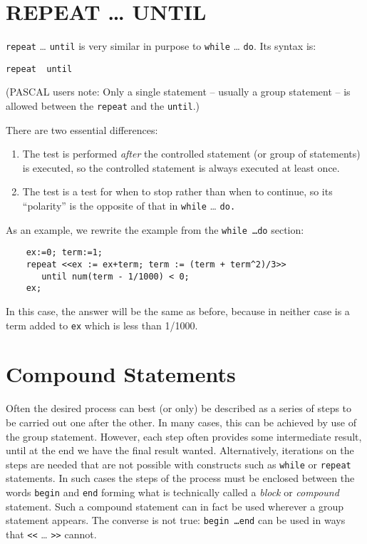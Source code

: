 \section{REPEAT \ldots{} UNTIL}
\hypertarget{command:REPEAT}{}
\hypertarget{reserved:UNTIL}{}

\texttt{repeat} \ldots{} \texttt{until} is very similar
in purpose to \texttt{while} \ldots{} \texttt{do}.  Its syntax is:
\begin{syntax}
  \texttt{repeat }\texttt{ until }
\end{syntax}
(PASCAL users note: Only a single statement -- usually a group statement
-- is allowed between the \texttt{repeat} and the \texttt{until}.)

There are two essential differences:
\begin{enumerate}
\item The test is performed \emph{after} the controlled statement (or group of
statements) is executed, so the controlled statement is always executed at
least once.

\item The test is a test for when to stop rather than when to continue, so its
``polarity'' is the opposite of that in \texttt{while} \ldots{} \texttt{do.}
\end{enumerate}

As an example, we rewrite the example from the \texttt{while \ldots do} section:
\begin{samepage}
\begin{verbatim}
    ex:=0; term:=1;
    repeat <<ex := ex+term; term := (term + term^2)/3>>
       until num(term - 1/1000) < 0;
    ex;
\end{verbatim}
\end{samepage}
In this case, the answer will be the same as before, because in neither
case is a term added to \texttt{ex} which is less than 1/1000.

\section{Compound Statements}
\hypertarget{command:BEGIN}{}

Often the desired process
can best (or only) be
described as a series of steps to be carried out one after the other.  In
many cases, this can be achieved by use of the group statement.  However, each step often provides some intermediate
result, until at the end we have the final result wanted.  Alternatively,
iterations on the steps are needed that are not possible with constructs
such as \texttt{while} or \texttt{repeat}
statements.  In such cases the steps of the process must be
enclosed between the words \texttt{begin} and \texttt{end} forming what is technically called a \emph{block} or
\emph{compound} statement.  Such a compound statement can in fact be used
wherever a group statement appears.  The converse is not true: \texttt{begin
\ldots end} can be used in ways
that \texttt{<}\texttt{<} \ldots{} \texttt{>}\texttt{>} cannot.

